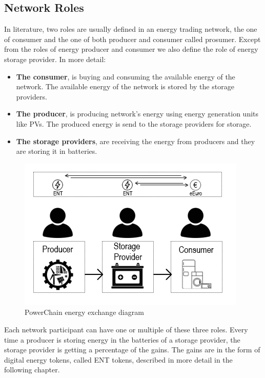 \subsection{Network Roles}
In literature, two roles are usually defined in an energy trading network, the one of consumer and the one of both producer and consumer called prosumer.
Except from the roles of energy producer and consumer we also define the role of energy storage provider. In more detail:
\begin{itemize}
    \item \textbf{The consumer}, is buying and consuming the available energy of the network. The available energy of the network is stored by the storage providers.
    \item \textbf{The producer}, is producing network's energy using energy generation units like PVs. The produced energy is send to the storage providers for storage.
    \item \textbf{The storage providers}, are receiving the energy from producers and they are storing it in batteries.
\end{itemize}
\begin{figure}[h!]
    \centering
    \includegraphics[scale=0.6]{Figures/powerchain_scheme.png}
    \caption{PowerChain energy exchange diagram}
\end{figure}
Each network participant can have one or multiple of these three roles. Every time a producer is storing energy in the batteries of a storage provider, the storage provider is getting
a percentage of the gains. The gains are in the form of digital energy tokens, called ENT tokens, described in more detail in the following chapter. \\

